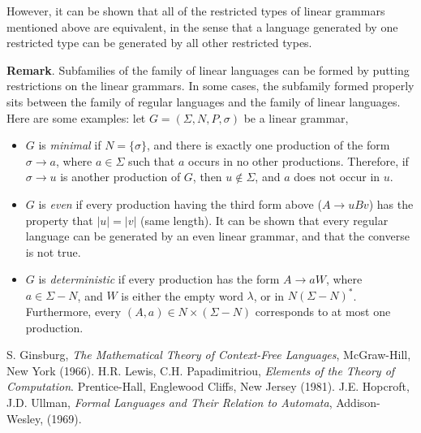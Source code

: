 \documentclass[12pt]{article}
\begin{document}
However, it can be shown that all of the restricted types of linear grammars mentioned above are equivalent, in the sense that a language generated by one restricted type can be generated by all other restricted types.

\textbf{Remark}.  Subfamilies of the family of linear languages can be formed by putting restrictions on the linear grammars.  In some cases, the subfamily formed properly sits between the family of regular languages and the family of linear languages.  Here are some examples:  let $G=(\Sigma,N,P,\sigma)$ be a linear grammar,
\begin{itemize}
\item $G$ is \emph{minimal} if $N=\lbrace \sigma \rbrace$, and there is exactly one production of the form $\sigma \to a$, where $a\in \Sigma$ such that $a$ occurs in no other productions.  Therefore, if $\sigma \to u$ is another production of $G$, then $u\notin \Sigma$, and $a$ does not occur in $u$.
\item $G$ is \emph{even} if every production having the third form above ($A\to uBv$) has the property that $|u|=|v|$ (same length).  It can be shown that every regular language can be generated by an even linear grammar, and that the converse is not true.
\item $G$ is \emph{deterministic} if every production has the form $A\to aW$, where $a\in \Sigma-N$, and $W$ is either the empty word $\lambda$, or in $N(\Sigma-N)^*$.  Furthermore, every $(A,a)\in N\times (\Sigma-N)$ corresponds to at most one production.
\end{itemize}

\begin{thebibliography}{9}
 S. Ginsburg, {\em The Mathematical Theory of Context-Free Languages}, McGraw-Hill, New York (1966).
 H.R. Lewis, C.H. Papadimitriou, {\em Elements of the Theory of Computation}. Prentice-Hall, Englewood Cliffs, New Jersey (1981).
 J.E. Hopcroft, J.D. Ullman, {\em Formal Languages and Their Relation to Automata}, Addison-Wesley, (1969).
\end{thebibliography}
\end{document}
